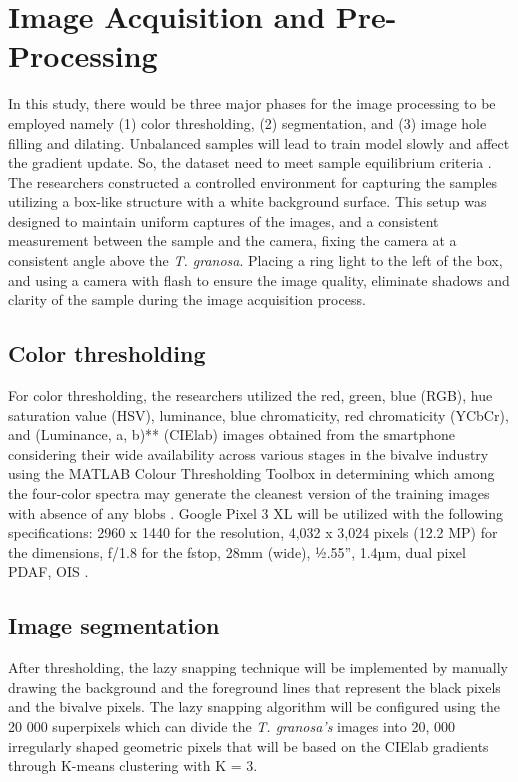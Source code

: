 \section{Image Acquisition and Pre-Processing}
\label{sec:imageprocess}
In this study, there would be three major phases for the image processing to be employed namely (1) color thresholding, (2) segmentation, and (3) image hole filling and dilating. Unbalanced samples will lead to train model slowly and affect the gradient update. So, the dataset need to meet sample equilibrium criteria \cite{cui2020}. The researchers constructed a controlled environment for capturing the samples utilizing a box-like structure with a white background surface. This setup was designed to maintain uniform captures of the images, and a consistent measurement between the sample and the camera, fixing the camera at a consistent angle above the \textit{T. granosa}. Placing a ring light to the left of the box, and using a camera with flash to ensure the image quality, eliminate shadows and clarity of the sample during the image acquisition process. 

\subsection{Color thresholding}
For color thresholding, the researchers utilized the red, green, blue (RGB), hue saturation value (HSV), luminance, blue chromaticity, red chromaticity (YCbCr), and (Luminance, a, b)** (CIElab) images obtained from the smartphone considering their wide availability across various stages in the bivalve industry using the MATLAB Colour Thresholding Toolbox in determining which among the four-color spectra may generate the cleanest version of the training images with absence of any blobs . Google Pixel 3 XL will be utilized with the following specifications: 2960 x 1440 for the resolution, 4,032 x 3,024 pixels (12.2 MP) for the dimensions, f/1.8 for the fstop, 28mm (wide), ½.55”, 1.4µm, dual pixel PDAF, OIS \cite{concepcion2023}. 

\subsection{Image segmentation}
After thresholding, the lazy snapping technique will be implemented by manually drawing the background and the foreground lines that represent the black pixels and the bivalve pixels. The lazy snapping algorithm will be configured using the 20 000 superpixels which can divide the \textit{T. granosa’s} images into 20, 000 irregularly shaped geometric pixels that will be based on the CIElab gradients through K-means clustering with K = 3.

